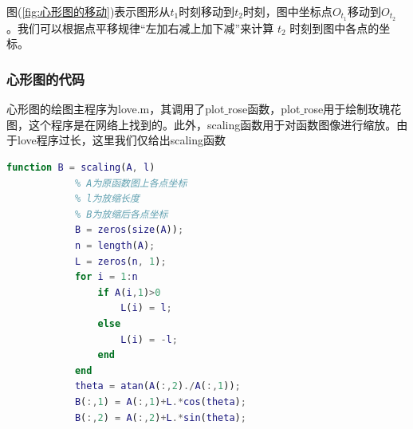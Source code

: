             \noindent 图(\ref{fig:心形图的移动})表示图形从$t_1$时刻移动到$t_2$时刻，图中坐标点$O_{t_1}$移动到$O_{t_2}$ 。我们可以根据点平移规律“左加右减上加下减”来计算 $t_2$ 时刻到图中各点的坐标。
        \subsubsection{心形图的代码}
            \par
            心形图的绘图主程序为love.m，其调用了plot$\_$rose函数，plot$\_$rose用于绘制玫瑰花图，这个程序是在网络上找到的。此外，scaling函数用于对函数图像进行缩放。由于love程序过长，这里我们仅给出scaling函数
            \begin{lstlisting}[language = Matlab]
            function B = scaling(A, l)
            % A为原函数图上各点坐标
            % l为放缩长度
            % B为放缩后各点坐标
            B = zeros(size(A));
            n = length(A);
            L = zeros(n, 1);
            for i = 1:n
                if A(i,1)>0
                    L(i) = l;
                else
                    L(i) = -l;
                end
            end
            theta = atan(A(:,2)./A(:,1));
            B(:,1) = A(:,1)+L.*cos(theta);
            B(:,2) = A(:,2)+L.*sin(theta);
            \end{lstlisting}


